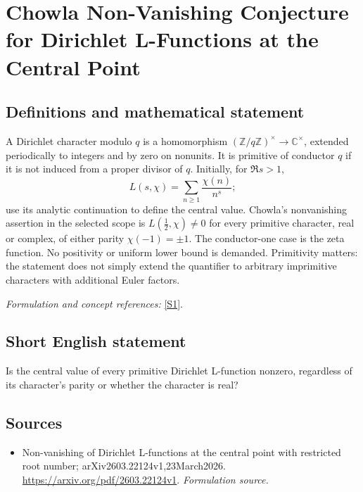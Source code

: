 \documentclass[11pt]{article}
\begin{document}
\section*{\texorpdfstring{Chowla Non-Vanishing Conjecture for Dirichlet L-Functions at the Central Point}{Chowla Non-Vanishing Conjecture for Dirichlet L-Functions at the Central Point}}\label{326}
\subsection{Definitions and mathematical statement}
A Dirichlet character modulo $q$ is a homomorphism $({\mathbb{Z}}/q{\mathbb{Z}})^\times\to{\mathbb{C}}^\times$, extended periodically to integers and by zero on nonunits. It is primitive of conductor $q$ if it is not induced from a proper divisor of $q$. Initially, for $\Re s>1$,
\[
 L(s,\chi)=\sum_{n\ge1}\frac{\chi(n)}{n^s};
\]
use its analytic continuation to define the central value. Chowla's nonvanishing assertion in the selected scope is $L(\tfrac12,\chi)\ne0$ for every primitive character, real or complex, of either parity $\chi(-1)=\pm1$. The conductor-one case is the zeta function. No positivity or uniform lower bound is demanded. Primitivity matters: the statement does not simply extend the quantifier to arbitrary imprimitive characters with additional Euler factors.
\par\smallskip\textit{Formulation and concept references:} \href{https://arxiv.org/pdf/2603.22124v1}{[S1]}.

\subsection{Short English statement}
Is the central value of every primitive Dirichlet L-function nonzero, regardless of its character's parity or whether the character is real?
\subsection{Sources}
\begin{itemize}
\item[S1]Non-vanishing of Dirichlet L-functions at the central point with restricted root number; arXiv2603.22124v1,23March2026.
\url{https://arxiv.org/pdf/2603.22124v1}.
\textit{Formulation source.}
\end{itemize}
\end{document}
